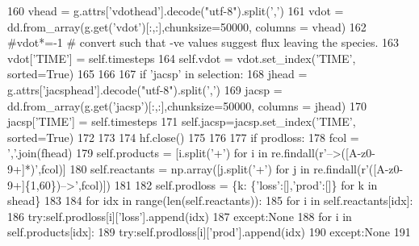 \begin{DoxyCode}
160                 vhead = g.attrs[\textcolor{stringliteral}{'vdothead'}].decode(\textcolor{stringliteral}{"utf-8"}).split(\textcolor{stringliteral}{','})
161                 vdot = dd.from\_array(g.get(\textcolor{stringliteral}{'vdot'})[:,:],chunksize=50000, columns = vhead)
162                 \textcolor{comment}{#vdot*=-1 # convert such that -ve values suggest flux leaving the species.}
163                 vdot[\textcolor{stringliteral}{'TIME'}] = self.timesteps
164                 self.vdot = vdot.set\_index(\textcolor{stringliteral}{'TIME'}, sorted=\textcolor{keyword}{True})
165 
166 
167             \textcolor{keywordflow}{if} \textcolor{stringliteral}{'jacsp'} \textcolor{keywordflow}{in} selection:
168                 jhead = g.attrs[\textcolor{stringliteral}{'jacsphead'}].decode(\textcolor{stringliteral}{"utf-8"}).split(\textcolor{stringliteral}{','})
169                 jacsp = dd.from\_array(g.get(\textcolor{stringliteral}{'jacsp'})[:,:],chunksize=50000, columns = jhead)
170                 jacsp[\textcolor{stringliteral}{'TIME'}] = self.timesteps
171                 self.jacsp=jacsp.set\_index(\textcolor{stringliteral}{'TIME'}, sorted=\textcolor{keyword}{True})
172 
173 
174             hf.close()
175 
176 
177             \textcolor{keywordflow}{if} prodloss:
178                 fcol = \textcolor{stringliteral}{','}.join(fhead)
179                 self.products = [i.split(\textcolor{stringliteral}{'+'}) \textcolor{keywordflow}{for} i \textcolor{keywordflow}{in} re.findall(\textcolor{stringliteral}{r'-->([A-z0-9+]*)'},fcol)]
180                 self.reactants = np.array([j.split(\textcolor{stringliteral}{'+'}) \textcolor{keywordflow}{for} j \textcolor{keywordflow}{in} re.findall(\textcolor{stringliteral}{r'([A-z0-9+]\{1,60\})-->'},fcol)])
181 
182                 self.prodloss = \{k: \{\textcolor{stringliteral}{'loss'}:[],\textcolor{stringliteral}{'prod'}:[]\} \textcolor{keywordflow}{for} k \textcolor{keywordflow}{in} shead\}
183                 
184                 \textcolor{keywordflow}{for} idx \textcolor{keywordflow}{in} range(len(self.reactants)):
185                     \textcolor{keywordflow}{for} i \textcolor{keywordflow}{in} self.reactants[idx]:
186                         \textcolor{keywordflow}{try}:self.prodloss[i][\textcolor{stringliteral}{'loss'}].append(idx)
187                         \textcolor{keywordflow}{except}:\textcolor{keywordtype}{None}
188                     \textcolor{keywordflow}{for} i \textcolor{keywordflow}{in} self.products[idx]:
189                         \textcolor{keywordflow}{try}:self.prodloss[i][\textcolor{stringliteral}{'prod'}].append(idx)
190                         \textcolor{keywordflow}{except}:\textcolor{keywordtype}{None}
191 
\end{DoxyCode}
\mbox{\label{classzhdf_1_1new_add2078473b549c2c0ec767646c9fb3f5}} 
